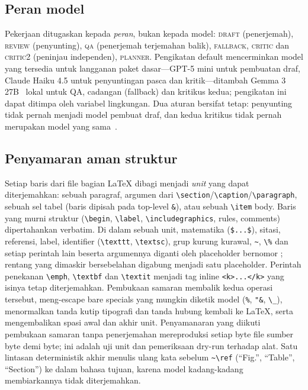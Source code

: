 \subsection{Peran model}
Pekerjaan ditugaskan kepada \emph{peran}, bukan kepada model: \textsc{draft} (penerjemah), \textsc{review} (penyunting), \textsc{qa} (penerjemah terjemahan balik), \textsc{fallback}, \textsc{critic} dan \textsc{critic2} (peninjau independen), \textsc{planner}. Pengikatan default mencerminkan model yang tersedia untuk langganan paket dasar---GPT-5 mini untuk pembuatan draf, Claude Haiku 4.5 untuk penyuntingan pasca dan kritik---ditambah Gemma 3 27B~\cite{gemma2025} lokal untuk QA, cadangan (fallback) dan kritikus kedua; pengikatan ini dapat ditimpa oleh variabel lingkungan. Dua aturan bersifat tetap: penyunting tidak pernah menjadi model pembuat draf, dan kedua kritikus tidak pernah merupakan model yang sama~\cite{panickssery2024selfpref,huang2024selfcorrect}.

\subsection{Penyamaran aman struktur}
\label{sec:mask}
Setiap baris dari file bagian LaTeX dibagi menjadi \emph{unit} yang dapat diterjemahkan: sebuah paragraf, argumen dari \verb|\section|/\verb|\caption|/\verb|\paragraph|, sebuah sel tabel (baris dipisah pada top-level \verb|&|), atau sebuah \verb|\item| body. Baris yang murni struktur (\verb|\begin|, \verb|\label|, \verb|\includegraphics|, rules, comments) dipertahankan verbatim. Di dalam sebuah unit, matematika (\verb|$...$|), sitasi, referensi, label, identifier (\verb|\texttt|, \verb|\textsc|), grup kurung kurawal, \verb|~|, \verb|\%| dan setiap perintah lain beserta argumennya diganti oleh placeholder bernomor ; rentang yang dimaskir bersebelahan digabung menjadi satu placeholder. Perintah penekanan \verb|\emph|, \verb|\textbf| dan \verb|\textit| menjadi tag inline \verb|<k>...</k>| yang isinya tetap diterjemahkan. Pembukaan samaran membalik kedua operasi tersebut, meng-escape bare specials yang mungkin diketik model (\verb|%|, \verb|"&|, \verb|\_|), menormalkan tanda kutip tipografi dan tanda hubung kembali ke LaTeX, serta mengembalikan spasi awal dan akhir unit. Penyamanaran yang diikuti pembukaan samaran tanpa penerjemahan mereproduksi setiap byte file sumber byte demi byte; ini adalah uji unit dan pemeriksaan dry-run terhadap alat. Satu lintasan deterministik akhir menulis ulang kata sebelum \verb|~\ref| (``Fig.'', ``Table'', ``Section'') ke dalam bahasa tujuan, karena model kadang-kadang membiarkannya tidak diterjemahkan.

